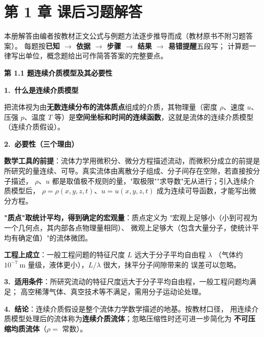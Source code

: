 \chapter*{第 1 章 课后习题解答}

\begin{tishi}
本册解答由编者按教材正文公式与例题方法逐步推导而成（教材原书不附习题答案）。
每题按\textbf{已知 $\to$ 依据 $\to$ 步骤 $\to$ 结果 $\to$ 易错提醒}五段写；
计算题一律写出单位，概念题给出可作简答答案的完整要点。
\end{tishi}

\noindent\textbf{第 1.1 题\quad 连续介质模型及其必要性}

\begin{jie}
\textbf{1.\ 什么是连续介质模型}

把流体视为由\textbf{无数连续分布的流体质点}组成的介质，其物理量（密度 $\rho$、速度 $u$、
压强 $p$、温度 $T$ 等）是\textbf{空间坐标和时间的连续函数}，这就是流体的连续介质模型
（连续介质假设）。

\textbf{2.\ 必要性（三个理由）}

\begin{xiaowen}
\item \textbf{数学工具的前提}：流体力学用微积分、微分方程描述流动，而微积分成立的前提是
所研究的量连续、可导。真实流体由离散分子组成、分子间存在空隙，若直接按分子描述，
$\rho$、$u$ 都是取值极不规则的量，"取极限""求导数"无从进行；引入连续介质模型后，
$\rho=\rho(x,y,z,t)$、$u=u(x,y,z,t)$ 成为连续可导函数，才能写出微分方程。
\item \textbf{"质点"取统计平均，得到确定的宏观量}：质点定义为
"宏观上足够小（小到可视为一个几何点，其内部各点物理量相同）、
微观上足够大（包含大量分子，使统计平均有确定值）"的流体微团。
\item \textbf{工程上成立}：一般工程问题的特征尺度 $L$ 远大于分子平均自由程 $\lambda$
（气体约 $10^{-7}\ \mathrm{m}$ 量级，液体更小），$L/\lambda$ 很大，抹平分子间隙带来的
误差可以忽略。
\end{xiaowen}

\textbf{3.\ 适用条件}：所研究流动的特征尺度远大于分子平均自由程，一般工程问题均满足；
高空稀薄气体、真空技术等不满足，需用分子运动论处理。

\textbf{4.\ 结论}：连续介质假设是整个流体力学数学描述的地基。按教材口径，
用连续介质模型处理后的流体称为\textbf{连续介质流体}；忽略压缩性时还可进一步简化为
\textbf{不可压缩均质流体}（$\rho=$ 常数）。
\end{jie}

